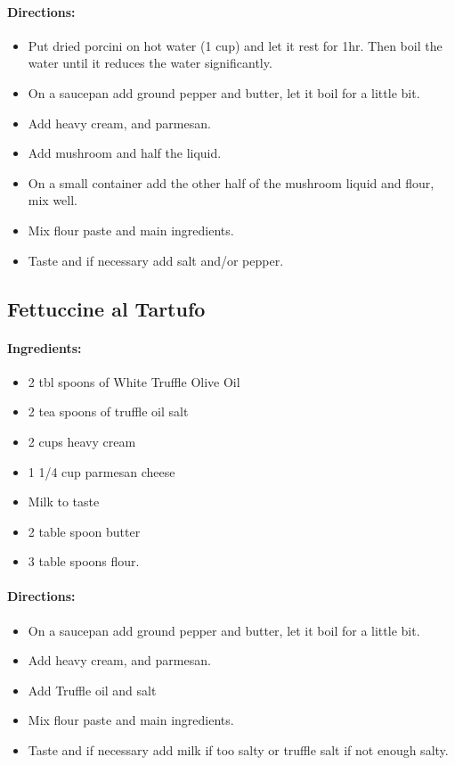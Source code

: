\documentclass{article}
\begin{document}
\paragraph{Directions:}
\begin{itemize}
	\item Put dried porcini on hot water (1 cup) and let it rest for 1hr. Then boil the water until it reduces the water significantly.
	\item On a saucepan add ground pepper and butter, let it boil for a little bit.
	\item Add heavy cream, and parmesan.
	\item Add mushroom and half the liquid.
	\item On a small container add the other half of the mushroom liquid and flour, mix well.
	\item Mix flour paste and main ingredients.
	\item Taste and if necessary add salt and/or pepper.
\end{itemize}

\subsection{Fettuccine al Tartufo}

\paragraph{Ingredients:}

\begin{itemize}
	\item 2 tbl spoons of White Truffle Olive Oil
	\item 2 tea spoons of truffle oil salt
	\item 2 cups heavy cream
	\item 1 1/4 cup parmesan cheese
	\item Milk to taste
	\item 2 table spoon butter
	\item 3 table spoons flour.
\end{itemize}

\paragraph{Directions:}
\begin{itemize}
	\item On a saucepan add ground pepper and butter, let it boil for a little bit.
	\item Add heavy cream, and parmesan.
	\item Add Truffle oil and salt
	\item Mix flour paste and main ingredients.
	\item Taste and if necessary add milk if too salty or truffle salt if not enough salty.
\end{itemize}
\end{document}
